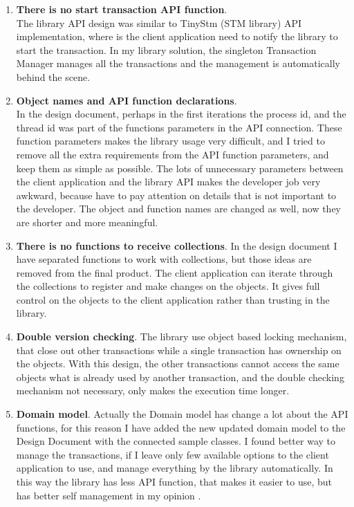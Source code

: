 \documentclass[12pt]{article}
\begin{document}
\begin{enumerate}
\item \textbf{There is no start transaction API function}.\\
The library API design was similar to TinyStm (STM library) API implementation, where is the client application need to notify the library to start the transaction. In my library solution, the singleton Transaction Manager manages all the transactions and the management is automatically behind the scene.  
\item \textbf{Object names and API function declarations}.\\
In the design document, perhaps in the first iterations the process id, and the thread id was part of the functions parameters in the API connection. These function parameters makes the library usage very difficult, and I tried to remove all the extra requirements from the API function parameters, and keep them as simple as possible. The lots of unnecessary parameters between the client application and the library API makes the developer job very awkward, because have to pay attention on details that is not important to the developer. The object and function names are changed as well, now they are shorter and more meaningful.
\item \textbf{There is no functions to receive collections}.
In the design document I have separated functions to work with collections, but those ideas are removed from the final product. The client application can iterate through the collections to register and make changes on the objects. It gives full control on the objects to the client application rather than trusting in the library.
\item \textbf{Double version checking}.
The library use object based locking mechanism, that close out other transactions while a single transaction has ownership on the objects. With this design, the other transactions cannot access the same objects what is already used by another transaction, and the double checking mechanism not necessary, only makes the execution time longer.
\item \textbf{Domain model}.
Actually the Domain model has change a lot about the API functions, for this reason I have added the new updated domain model to the Design Document with the connected sample classes. I found better way to manage the transactions, if I leave only few available options to the client application to use, and manage everything by the library automatically. In this way the library has less API function, that makes it easier to use, but has better self management in my opinion
. 
\end{enumerate}
\end{document}

